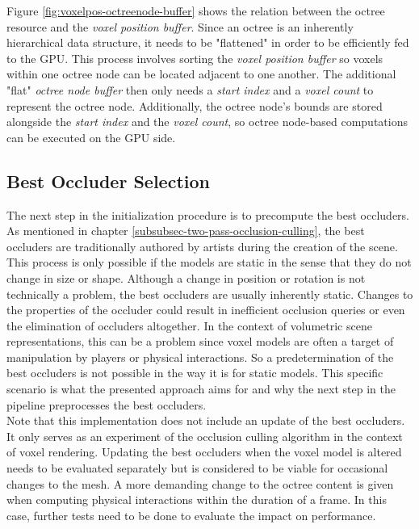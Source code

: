 \noindent
Figure \ref{fig:voxelpos-octreenode-buffer} shows the relation between the octree resource and the \emph{voxel position buffer}.
Since an octree is an inherently hierarchical data structure, it needs to be "flattened" in order to be efficiently fed 
to the \ac{GPU}. This process involves sorting the \emph{voxel position buffer} so voxels within one octree node can be 
located adjacent to one another. The additional "flat" \emph{octree node buffer} then only needs a \emph{start index} 
and a \emph{voxel count} to represent the octree node. Additionally, the octree node's bounds are stored alongside the 
\emph{start index} and the \emph{voxel count}, so octree node-based computations can be executed on the \ac{GPU} side. \\


\subsection*{Best Occluder Selection} \label{subsec-best-occluder-selection}

The next step in the initialization procedure is to precompute the best occluders. As mentioned in chapter 
\ref{subsubsec-two-pass-occlusion-culling}, the best occluders are traditionally authored by artists during the creation 
of the scene. This process is only possible if the models are static in the sense that they do not change in size or 
shape. Although a change in position or rotation is not technically a problem, the best occluders are usually inherently 
static. Changes to the properties of the occluder could result in inefficient occlusion queries or even the elimination 
of occluders altogether. In the context of volumetric scene representations, this can be a problem since voxel models 
are often a target of manipulation by players or physical interactions. So a predetermination of the best occluders is 
not possible in the way it is for static models. This specific scenario is what the presented approach aims for and why 
the next step in the pipeline preprocesses the best occluders. \\

\noindent
Note that this implementation does not include an update of the best occluders. It only serves as an experiment of 
the occlusion culling algorithm in the context of voxel rendering. Updating the best occluders when the voxel model 
is altered needs to be evaluated separately but is considered to be viable for occasional changes to the mesh. A 
more demanding change to the octree content is given when computing physical interactions within the duration of a 
frame. In this case, further tests need to be done to evaluate the impact on performance. \\

